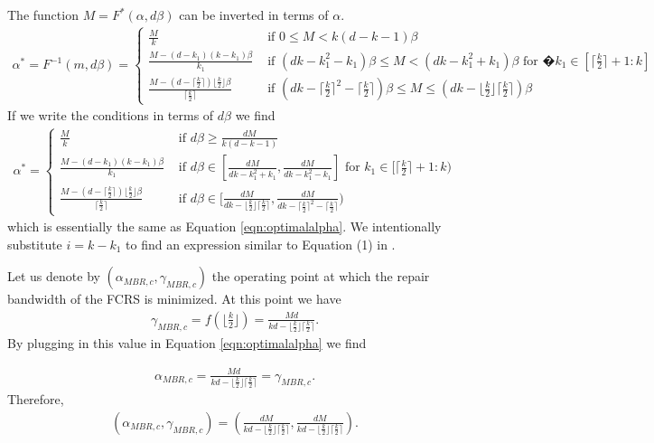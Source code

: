 \documentclass[journal,onecolumn,draftcls]{IEEEtran}
\begin{document}
\begin{IEEEproof}
The function $M = F^*(\alpha,d\beta)$ can be inverted in terms of $\alpha$. 
\begin{eqnarray*}
\alpha^* = F^{-1}(m,d\beta) = \begin{cases}
\frac{M}{k} & \mbox{ if } 0\le M < k(d-k-1)\beta\\
\frac{M - (d-k_1)(k-k_1)\beta}{k_1} & \mbox{ if }  (dk - k_1^2-k_1)\beta 
 \le M < (dk - k_1^2+k_1)\beta \mbox{ for }�k_1 \in[\lceil\frac{k}{2} \rceil + 1: k] \\
\frac{M - (d-\lceil\frac{k}{2}\rceil)\lfloor\frac{k}{2}\rfloor\beta}{\lceil\frac{k}{2}\rceil} & \mbox{ if } (dk - \lceil\frac{k}{2}\rceil^2 -\lceil\frac{k}{2}\rceil ) \beta
 \le M \le (dk - \lfloor\frac{k}{2}\rfloor \lceil\frac{k}{2}\rceil) \beta 
\end{cases}
\end{eqnarray*}
If we write the conditions in terms of $d\beta$ we find
\begin{eqnarray*}
\alpha^* = \begin{cases}
\frac{M}{k} &\mbox{ if } d\beta \ge \frac{dM}{k(d-k-1)}\\
\frac{M - (d-k_1)(k-k_1)\beta}{k_1} &\mbox{ if } d\beta \in [\frac{dM}{dk - k_1^2 + k_1}, \frac{dM}{dk-k_1^2-k_1}] \mbox{ for } k_1 \in[\lceil\frac{k}{2} \rceil + 1: k)\\
\frac{M- (d-\lceil\frac{k}{2}\rceil)\lfloor\frac{k}{2}\rfloor\beta}{\lceil\frac{k}{2}\rceil} & \mbox{ if } d\beta \in [\frac{dM}{dk - \lfloor\frac{k}{2}\rfloor \lceil\frac{k}{2}\rceil}, \frac{dM}{dk - \lceil\frac{k}{2}\rceil^2 - \lceil\frac{k}{2}\rceil} )
\end{cases}
\end{eqnarray*}
which is essentially the same as Equation \eqref{eqn:optimalalpha}. We intentionally substitute $i = k - k_1$ to find an expression similar to Equation (1) in \cite{dimakis2010network}.
\end{IEEEproof}
Let us denote by $(\alpha_{MBR,c},\gamma_{MBR,c})$ the operating point at which the repair bandwidth of the FCRS is minimized. At this point we have 
\begin{eqnarray}
\gamma_{MBR,c} = f(\lfloor\frac{k}{2}\rfloor)= \frac{{M}d}{kd - \lfloor\frac{k}{2}\rfloor \lceil\frac{k}{2}\rceil}.
\label{eqn:mbrfunctional}
\end{eqnarray}
By plugging in this value in Equation \eqref{eqn:optimalalpha} we find
 
\begin{eqnarray*}
\alpha_{MBR,c} = \frac{{M}d}{kd - \lfloor\frac{k}{2}\rfloor \lceil\frac{k}{2}\rceil} = \gamma_{MBR,c}.
\end{eqnarray*}
Therefore,
\begin{eqnarray*}
(\alpha_{MBR,c}, \gamma_{MBR,c}) = ( \frac{d{M}}{kd - \lfloor\frac{k}{2}\rfloor\lceil\frac{k}{2}\rceil}, \frac{d{M}}{kd - \lfloor\frac{k}{2}\rfloor\lceil\frac{k}{2}\rceil}).
\end{eqnarray*}
\end{document}
